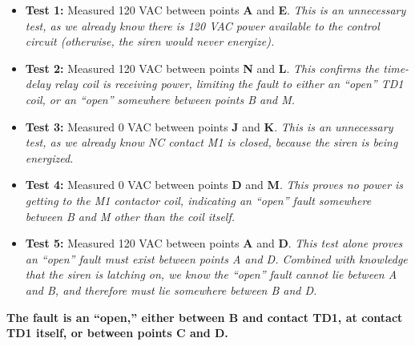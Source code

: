 \vfil 

\eject






\begin{itemize}
\item{} {\bf Test 1:} Measured 120 VAC between points {\bf A} and {\bf E}.  {\it This is an unnecessary test, as we already know there is 120 VAC power available to the control circuit (otherwise, the siren would never energize).}
\vskip 5pt
\item{} {\bf Test 2:} Measured 120 VAC between points {\bf N} and {\bf L}.  {\it This confirms the time-delay relay coil is receiving power, limiting the fault to either an ``open'' TD1 coil, or an ``open'' somewhere between points B and M.}
\vskip 5pt
\item{} {\bf Test 3:} Measured 0 VAC between points {\bf J} and {\bf K}.  {\it This is an unnecessary test, as we already know NC contact M1 is closed, because the siren is being energized.}
\vskip 5pt
\item{} {\bf Test 4:} Measured 0 VAC between points {\bf D} and {\bf M}.  {\it This proves no power is getting to the M1 contactor coil, indicating an ``open'' fault somewhere between B and M other than the coil itself.}
\vskip 5pt
\item{} {\bf Test 5:} Measured 120 VAC between points {\bf A} and {\bf D}.  {\it This test alone proves an ``open'' fault must exist between points A and D.  Combined with knowledge that the siren is latching on, we know the ``open'' fault cannot lie between A and B, and therefore must lie somewhere between B and D.}
\end{itemize}

\vskip 10pt

{\bf The fault is an ``open,'' either between B and contact TD1, at contact TD1 itself, or between points C and D.}












